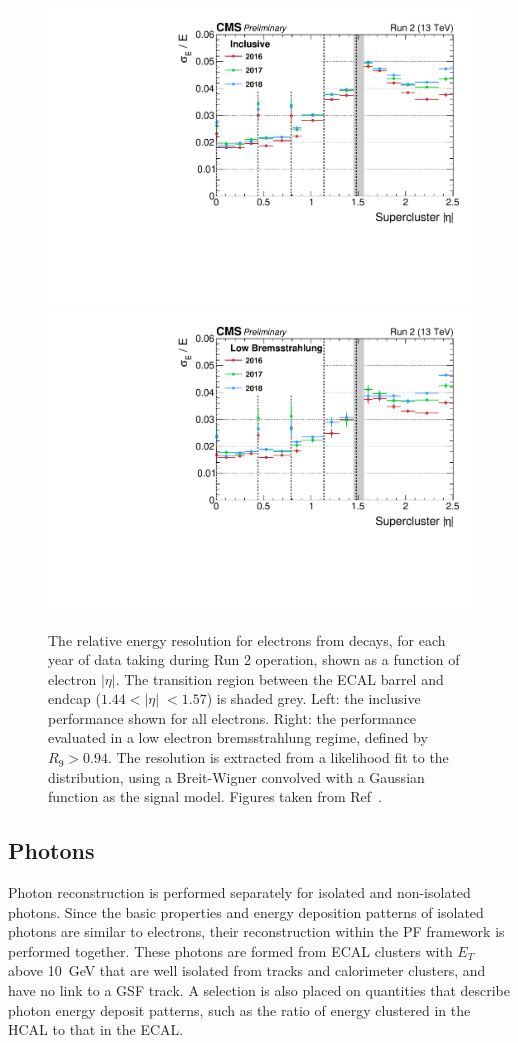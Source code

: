 \begin{figure}[htbp!]
\centering
\includegraphics[width =0.49\linewidth]{Figures/Detector/CMS/energy_res_vs_eta_inc.pdf}\hfill%
\includegraphics[width =0.49\linewidth]{Figures/Detector/CMS/energy_res_vs_eta_low_brem.pdf}\hfill
\caption[The relative energy resolution for electrons from \Zee decays.]{The relative energy resolution for electrons from \Zee decays, for each year of data taking during Run 2 operation, shown as a function of electron $|\eta|$. The transition region between the ECAL barrel and endcap ($1.44<|\eta|\;<1.57$) is shaded grey. Left: the inclusive performance shown for all electrons. Right: the performance evaluated in a low electron bremsstrahlung regime, defined by $R_{9}>0.94$.
The resolution is extracted from a likelihood fit to the \mee distribution, using a Breit-Wigner convolved with a Gaussian function as the \Zee signal model. Figures taken from Ref~\cite{Run2_ECAL_plots}.} %
\label{fig:cms_energy_res_vs_eta}                                              
\end{figure}


\subsection{Photons}

Photon reconstruction is performed separately for isolated and non-isolated photons. Since the basic properties and energy deposition patterns of isolated photons are similar to electrons, their reconstruction within the PF framework is performed together. These photons are formed from ECAL clusters with $E_{T}$ above 10~GeV that are well isolated from tracks and calorimeter clusters, and have no link to a GSF track. A selection is also placed on quantities that describe photon energy deposit patterns, such as the ratio of energy clustered in the HCAL to that in the ECAL.

